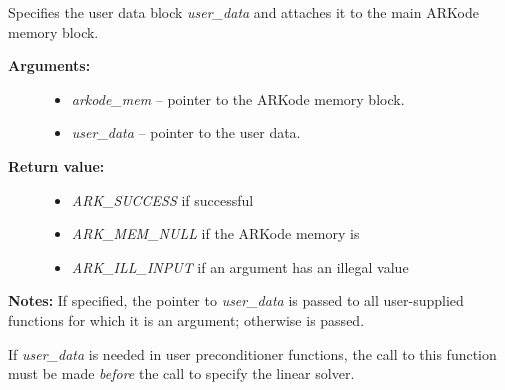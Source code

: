 \documentclass[letterpaper,10pt,english]{sphinxmanual}
\begin{document}
\begin{fulllineitems}
\label{c_interface/User_callable:ARKodeSetUserData}
Specifies the user data block \emph{user\_data} and
attaches it to the main ARKode memory block.
\begin{description}
\item[{\textbf{Arguments:}}] \leavevmode\begin{itemize}
\item {} 
\emph{arkode\_mem} -- pointer to the ARKode memory block.

\item {} 
\emph{user\_data} -- pointer to the user data.

\end{itemize}

\item[{\textbf{Return value:}}] \leavevmode\begin{itemize}
\item {} 
\emph{ARK\_SUCCESS} if successful

\item {} 
\emph{ARK\_MEM\_NULL} if the ARKode memory is 

\item {} 
\emph{ARK\_ILL\_INPUT} if an argument has an illegal value

\end{itemize}

\end{description}

\textbf{Notes:} If specified, the pointer to \emph{user\_data} is passed to all
user-supplied functions for which it is an argument; otherwise
 is passed.

If \emph{user\_data} is needed in user preconditioner functions, the
call to this function must be made \emph{before} the call to
specify the linear solver.

\end{fulllineitems}
\end{document}
